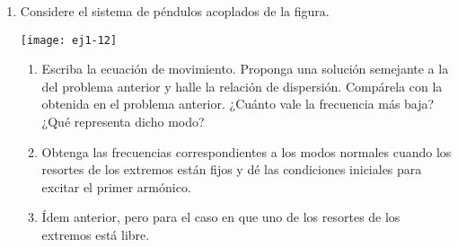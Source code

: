 \documentclass[11pt,spanish,a4paper]{article}
\begin{document}
\begin{enumerate}
\item
\begin{minipage}[t][2cm]{0.6\textwidth}
 Considere el sistema de péndulos acoplados de la figura. 
\end{minipage}
\begin{minipage}[c][2cm][t]{0.35\textwidth}
  \texttt{[image: ej1-12]}
\end{minipage}
\begin{enumerate}
	\item Escriba la ecuación de movimiento. Proponga una solución semejante a la del problema anterior y halle la relación de dispersión. Compárela con la obtenida en el problema anterior.
	¿Cuánto vale la frecuencia más baja?
	¿Qué representa dicho modo? 
	\item Obtenga las frecuencias correspondientes a los modos normales cuando los resortes de los extremos están fijos y dé las condiciones iniciales para excitar el primer armónico. 
	\item Ídem anterior, pero para el caso en que uno de los resortes de los extremos está libre. 
\end{enumerate}



\end{enumerate}
\end{document}
